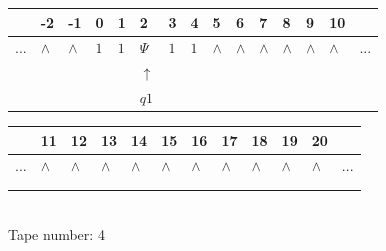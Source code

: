 \documentclass[11pt]{article}
\begin{document}
\begin{table}[H]
\centering
\begin{tabular}{lllllllllllllll}
 & -2 & -1 & 0 & 1 & 2 & 3 & 4 & 5 & 6 & 7 & 8 & 9 & 10 & \\
\hline
$...$ & \multicolumn{1}{|l|}{$\wedge$} & \multicolumn{1}{|l|}{$\wedge$} & \multicolumn{1}{|l|}{$1$} & \multicolumn{1}{|l|}{$1$} & \multicolumn{1}{|l|}{$\Psi$} & \multicolumn{1}{|l|}{$1$} & \multicolumn{1}{|l|}{$1$} & \multicolumn{1}{|l|}{$\wedge$} & \multicolumn{1}{|l|}{$\wedge$} & \multicolumn{1}{|l|}{$\wedge$} & \multicolumn{1}{|l|}{$\wedge$} & \multicolumn{1}{|l|}{$\wedge$} & \multicolumn{1}{|l|}{$\wedge$} & $...$\\
\hline
&  &  &  &  & $\uparrow$ &  &  &  &  &  &  &  &  &  \\
&  &  &  &  & $ q1 $ &  &  &  &  &  &  &  &  &  \\
\end{tabular}
\begin{tabular}{llllllllllll}
 & 11 & 12 & 13 & 14 & 15 & 16 & 17 & 18 & 19 & 20 & \\
\hline
$...$ & \multicolumn{1}{|l|}{$\wedge$} & \multicolumn{1}{|l|}{$\wedge$} & \multicolumn{1}{|l|}{$\wedge$} & \multicolumn{1}{|l|}{$\wedge$} & \multicolumn{1}{|l|}{$\wedge$} & \multicolumn{1}{|l|}{$\wedge$} & \multicolumn{1}{|l|}{$\wedge$} & \multicolumn{1}{|l|}{$\wedge$} & \multicolumn{1}{|l|}{$\wedge$} & \multicolumn{1}{|l|}{$\wedge$} & $...$\\
\hline
&  &  &  &  &  &  &  &  &  &  &  \\
&  &  &  &  &  &  &  &  &  &  &  \\
\end{tabular}
\\
Tape number: 4
\noindent\makebox[\linewidth]{\hdashrule{\textwidth}{1pt}{1pt}}\end{table}
\end{document}
